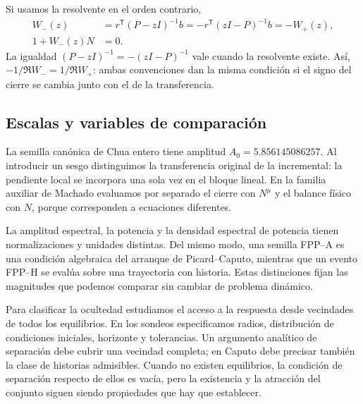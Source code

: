 Si usamos la resolvente en el orden contrario,
\begin{equation}
 \begin{aligned}
 W_-(z)&=r^{\mathsf T}(P-zI)^{-1}b
        =-r^{\mathsf T}(zI-P)^{-1}b=-W_+(z),\\
 1+W_-(z)N&=0.
 \end{aligned}
 \label{eq:master-wminus}
\end{equation}
La igualdad \((P-zI)^{-1}=-(zI-P)^{-1}\) vale cuando la resolvente existe.
Así, \(-1/\Re W_-=1/\Re W_+\): ambas convenciones dan la misma condición
si el signo del cierre se cambia junto con el de la transferencia.

\subsection{Escalas y variables de comparación}

La semilla canónica de Chua entero tiene amplitud
\(A_0=5.856145086257\). Al introducir un sesgo distinguimos la
transferencia original de la incremental: la pendiente local se incorpora
una sola vez en el bloque lineal. En la familia auxiliar de Machado
evaluamos por separado el cierre con \(N^\mu\) y el balance físico con
\(N\), porque corresponden a ecuaciones diferentes.

La amplitud espectral, la potencia y la densidad espectral de potencia
tienen normalizaciones y unidades distintas. Del mismo modo, una semilla
FPP--A es una condición algebraica del arranque de Picard--Caputo, mientras
que un evento FPP--H se evalúa sobre una trayectoria con historia. Estas
distinciones fijan las magnitudes que podemos comparar sin cambiar de
problema dinámico.

Para clasificar la ocultedad estudiamos el acceso a la respuesta desde
vecindades de todos los equilibrios. En los sondeos especificamos radios,
distribución de condiciones iniciales, horizonte y tolerancias. Un argumento
analítico de separación debe cubrir una vecindad completa; en Caputo debe
precisar también la clase de historias admisibles. Cuando no existen
equilibrios, la condición de separación respecto de ellos es vacía, pero
la existencia y la atracción del conjunto siguen siendo propiedades que
hay que establecer.
